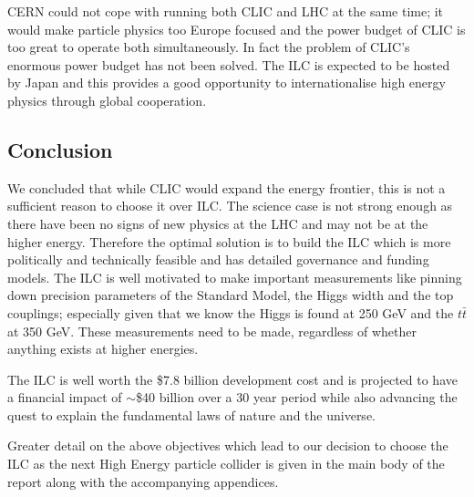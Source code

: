 CERN could not cope with running both CLIC and LHC at the same time; it would make particle physics too Europe focused and the power budget of CLIC is too great to operate both simultaneously. In fact the problem of CLIC's enormous power budget has not been solved. The ILC is expected to be hosted by Japan and this provides a good opportunity to internationalise high energy physics through global cooperation.

\subsection{Conclusion}

We concluded that while CLIC would expand the energy frontier, this is not a sufficient reason to choose it over ILC. The science case is not strong enough as there have been no signs of new physics at the LHC and may not be at the higher energy. Therefore the optimal solution is to build the ILC which is more politically and technically feasible and has detailed governance and funding models. The ILC is well motivated to make important measurements like pinning down precision parameters of the Standard Model, the Higgs width and the top couplings; especially given that we know the Higgs is found at 250 GeV and the $t\bar{t}$  at 350 GeV. These measurements need to be made, regardless of whether anything exists at higher energies.

The ILC is well worth the \$7.8 billion development cost and is projected to have a financial impact of $\sim$\$40 billion over a 30 year period while also advancing the quest to explain the fundamental laws of nature and the universe.

Greater detail on the above objectives which lead to our decision to choose the ILC as the next High Energy particle collider is given in the main body of the report along with the accompanying appendices.